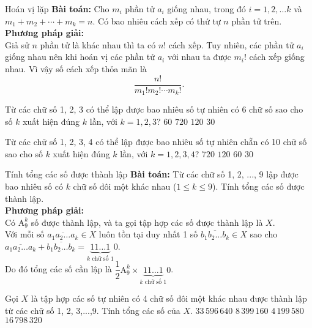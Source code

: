 \begin{dang}{Hoán vị lặp}
\textbf{Bài toán:} Cho $m_i$ phần tử $a_i$ giống nhau, trong đó $i=1,2,\ldots k$ và $m_1+m_2+\cdots + m_k =n$. Có bao nhiêu cách xếp có thứ tự $n$ phần tử trên.  \\
\textbf{Phương pháp giải:}\\
Giả sử $n$ phần tử là khác nhau thì ta có $n!$ cách xếp. Tuy nhiên, các phần tử $a_i$ giống nhau nên khi hoán vị các phần tử $a_i$ với nhau ta được $m_i !$ cách xếp giống nhau. Vì vậy số cách xếp thỏa mãn là
$$\dfrac{n!}{m_1 ! m_2 ! \cdots m_k !}.$$
\end{dang}
\begin{vd}%
Từ các chữ số 1, 2, 3 có thể lập được bao nhiêu số tự nhiên có 6 chữ số sao cho số $k$ xuất hiện đúng $k$ lần, với $k=1,2,3$?
\choice
{\True $60$}
{$720$}
{$120$}
{$30$}
\end{vd}
\begin{vd}%
Từ các chữ số 1, 2, 3, 4 có thể lập được bao nhiêu số tự nhiên chẵn có 10 chữ số sao cho số $k$ xuất hiện đúng $k$ lần, với $k=1,2,3,4$?
\choice
{$720$}
{$120$}
{\True $60$}
{$30$}
\end{vd}

\begin{dang}{Tính tổng các số được thành lập}
\textbf{Bài toán:} Từ các chữ số 1, 2, ..., 9 lập được bao nhiêu số có $k$ chữ số đôi một khác nhau ($1\le k \le 9$). Tính tổng các số được thành lập.\\
\textbf{Phương pháp giải:}\\
Có $\mathrm{A}^k_9$ số được thành lập, và ta gọi tập hợp các số được thành lập là $X$.\\
Với mỗi số $\overline{a_1a_2\ldots a_k} \in X$ luôn tồn tại duy nhất 1 số $\overline{b_1b_2\ldots b_k} \in X$ sao cho $\overline{a_1a_2\ldots a_k} + \overline{b_1b_2\ldots b_k}= \underbrace{11\ldots 1}_{k \text{ chữ số } 1}0$.\\
Do đó tổng các số cần lập là 
$\dfrac{1}{2}\mathrm{A}^k_9\times \underbrace{11\ldots 1}_{k \text{ chữ số } 1}0$.
\end{dang}
\begin{vd}%
Gọi $X$ là tập hợp các số tự nhiên có 4 chữ số đôi một khác nhau được thành lập từ các chữ số 1, 2, 3,...,9. Tính tổng các số của $X$.
\choice
{$33\,596\,640$}
{$8\,399\,160$}
{$4\,199\,580$}
{\True $16\, 798\,320$}
\end{vd}


